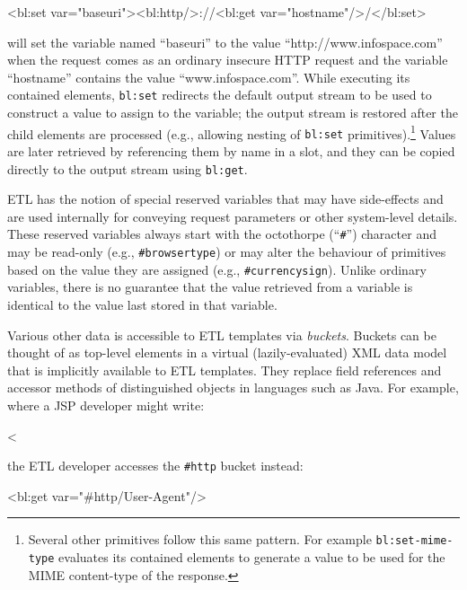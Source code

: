 \documentclass{www2003-submission}
\newcommand{\B}{\discretionary{}{}{}}
\newcommand{\smtexttt}[1]{{\small\texttt{#1}}}
\newenvironment{smallverbatim}%
{\renewcommand{\baselinestretch}{1}\small\verbatim}%
{\renewcommand{\baselinestretch}{2}\endverbatim}
\begin{document}
\begin{smallverbatim}
<bl:set var="baseuri"><bl:http/>://<bl:get
 var="hostname"/>/</bl:set>
\end{smallverbatim}

\noindent will set the variable named ``baseuri'' to the value
``http://www.\B{}infospace.\B{}com'' when the request comes as an
ordinary insecure HTTP request and the variable ``hostname'' contains
the value ``www.\B{}infospace.\B{}com''.  While executing its contained
elements, \smtexttt{bl:set} redirects the default output stream to be
used to construct a value to assign to the variable; the output stream
is restored after the child elements are processed (e.g., allowing
nesting of \smtexttt{bl:set} primitives).\footnote{Several other
primitives follow this same pattern.  For example
\smtexttt{bl:set-mime-type} evaluates its contained elements to
generate a value to be used for the MIME content-type of the
response.}  Values are later retrieved by referencing them by name
in a slot, and they can be copied directly to the output stream using
\smtexttt{bl:get}.

ETL has the notion of special reserved variables that may have
side-effects and are used internally for conveying request parameters or
other system-level details.  These reserved variables always start with
the octothorpe (``\smtexttt{\#}'') character and may be read-only (e.g.,
\smtexttt{\#browsertype}) or may alter the behaviour of primitives based
on the value they are assigned (e.g., \smtexttt{\#currencysign}).  
Unlike ordinary variables, there is no guarantee that the value
retrieved from a variable is identical to the value last stored in that
variable.

Various other data is accessible to ETL templates via 
\emph{buckets}. Buckets can be thought of as top-level elements in a virtual
(lazily-evaluated) XML data model that is implicitly available to ETL
templates.  They replace field references and accessor methods of
distinguished objects in languages such as Java.  For example, where a
JSP developer might write:

\begin{smallverbatim}
<%
\end{smallverbatim}

\noindent the ETL developer accesses the \smtexttt{\#http}
bucket instead:

\begin{smallverbatim}
<bl:get var="#http/User-Agent"/>
\end{smallverbatim}
\end{document}
